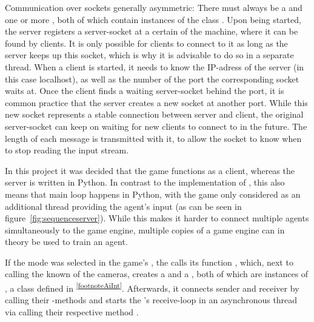 Communication over sockets generally asymmetric: There must always be a  and one or more , both of which contain instances of the class . Upon being started, the server registers a server-socket at a certain  of the machine, where it can be found by clients. It is only possible for clients to connect to it as long as the server keeps up this socket, which is why it is advisable to do so in a separate thread. When a client is started, it needs to know the IP-adress of the server (in this case localhost), as well as the number of the port the corresponding socket waits at. Once the client finds a waiting server-socket behind the port, it is common practice that the server creates a new socket at another port. While this new socket represents a stable connection between server and client, the original server-socket can keep on waiting for new clients to connect to in the future. The length of each message is transmitted with it, to allow the socket to know when to stop reading the input stream.

In this project it was decided that the game functions as a client, whereas the server is written in Python. In contrast to the implementation of \cite{loiacono_simulated_2013}, this also means that main loop happens in Python, with the game only considered as an additional thread providing the agent's input (as can be seen in figure~\ref{fig:sequenceserver}). While this makes it harder to connect multiple agents simultaneously to the game engine, multiple copies of a game engine can in theory be used to train an agent.

If the  mode was selected in the game's , the  calls 
its function , which, next to calling the known  of the cameras, creates a  and a , both of which are instances of , a class defined in \textsuperscript{\ref{footnoteAiInt}}. Afterwards, it connects sender and receiver by calling their -methods and starts the 's receive-loop in an asynchronous thread via calling their respective method . 

